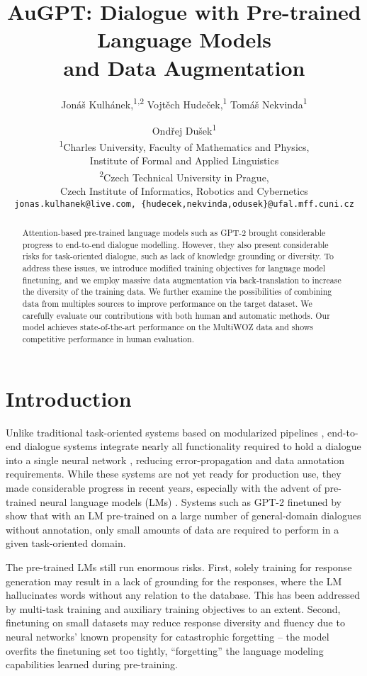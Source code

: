 \documentclass[11pt,a4paper]{article}
\title{AuGPT: Dialogue with Pre-trained Language Models \\ and Data Augmentation}
\author{Jonáš Kulhánek,\textsuperscript{\rm 1,2} Vojtěch Hudeček,\textsuperscript{\rm 1} Tomáš Nekvinda\textsuperscript{\rm 1} \and Ondřej Dušek\textsuperscript{\rm 1} \\
\textsuperscript{\rm 1}Charles University, Faculty of Mathematics and Physics, \\ Institute of Formal and Applied Linguistics \vspace{1mm}\\
\textsuperscript{\rm 2}Czech Technical University in Prague, \\ Czech Institute of Informatics, Robotics and Cybernetics\\
\texttt{jonas.kulhanek@live.com, \{hudecek,nekvinda,odusek\}@ufal.mff.cuni.cz}
}
\begin{document}
\maketitle
\begin{abstract}
Attention-based pre-trained language models such as GPT-2 brought considerable progress to end-to-end dialogue modelling. However, they also present considerable risks for task-oriented dialogue, such as lack of knowledge grounding or diversity. To address these issues, we introduce modified training objectives for language model finetuning, and we employ massive data augmentation via back-translation to increase the diversity of the training data. We further examine the possibilities of combining data from multiples sources to improve performance on the target dataset. We carefully evaluate our contributions with both human and automatic methods. Our model achieves state-of-the-art performance on the MultiWOZ data and shows competitive performance in human evaluation.
\end{abstract}

\section{Introduction}
Unlike traditional task-oriented systems based on modularized pipelines \cite{young2013, gao2018}, end-to-end dialogue systems integrate nearly all functionality required to hold a dialogue into a single neural network \cite{wen2017,manning2017,lei2018}, reducing error-propagation and data annotation requirements. While these systems are not yet ready for production use, they made considerable progress in recent years, especially with the advent of pre-trained neural language models (LMs) \cite{devlin2019,radford2019,zhang2020dialogpt}.
Systems such as GPT-2 finetuned by \citet{budzianowski2019} show that with an LM pre-trained on a large number of general-domain dialogues without annotation, only small amounts of data are required to perform in a given task-oriented domain.

The pre-trained LMs still run enormous risks. First, solely training for response generation may result in a lack of grounding for the responses, where the LM hallucinates words without any relation to the database. This has been addressed by multi-task training and auxiliary training objectives \cite{peng2020} to an extent. Second, finetuning on small datasets may reduce response diversity and fluency due to neural networks' known propensity for catastrophic forgetting \cite{greco_psycholinguistics_2019} -- the model overfits the finetuning set too tightly, “forgetting” the language modeling capabilities learned during pre-training.
\end{document}
